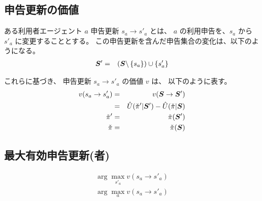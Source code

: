 \subsection{申告更新の価値}
ある利用者エージェント $a$ 申告更新 $s_a \to s'_a$ とは、
$a$ の利用申告を、$s_a$ から $s'_a$ に変更することとする。
この申告更新を含んだ申告集合の変化は、以下のようになる。
  \begin{eqnarray}
    {\bm{S}}' & = & ({\bm{S}} \backslash \left\{ s_a \right\}) \cup\left\{ s'_a \right\}
  \end{eqnarray}

これらに基づき、
申告更新 $s_a \to s'_a$ の価値 $v$ は、
以下のように表す。
  \begin{eqnarray}
    v(s_a \to s'_a) & = & v({\bm{S}} \to {\bm{S}}')
  \\
      & = &
        \hat{U}(\check{\pi}' | {\bm{S}}') -
        \hat{U}(\check{\pi} | {\bm{S}})
  \\
    \check{\pi}' & = & \check{\pi}({\bm{S}}')
  \\
    \check{\pi} & = & \check{\pi}({\bm{S}})
  \end{eqnarray}

\subsection{最大有効申告更新(者)}

  \begin{eqnarray}
    \arg\max_{s'_a} v(s_a \to s'_a)
    \\
    \arg\max_{a} v(s_a \to s'_a)
  \end{eqnarray}


